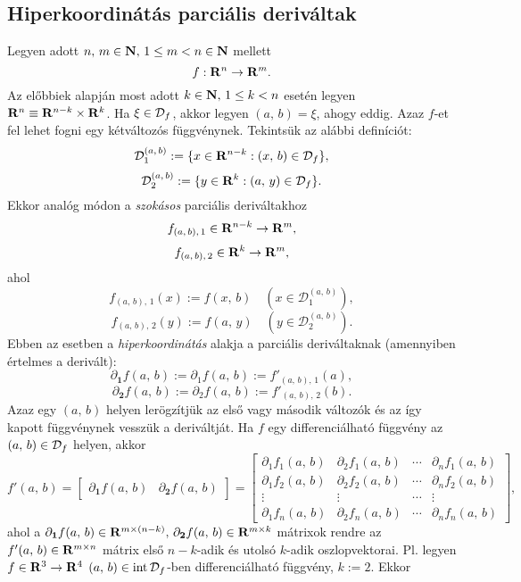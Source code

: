 \subsection{Hiperkoordinátás parciális deriváltak}
Legyen adott $n, \, m \in \mathbf{N}, \, 1 \leq m < n \in \mathbf{N}$ mellett
\[
	f : \mathbf{R}^n \to \mathbf{R}^m.
\]
Az előbbiek alapján most adott $k \in \mathbf{N}, \, 1 \leq k < n$ esetén legyen $\mathbf{R}^n \equiv \mathbf{R}^{n-k} \times \mathbf{R}^k$. Ha $\xi \in \mathcal{D}_f$, akkor legyen $(a, \, b) = \xi$, ahogy eddig. Azaz $f$-et fel lehet fogni egy kétváltozós függvénynek. Tekintsük az alábbi definíciót:
\[
	\mathcal{D}_1^{(a, \, b)} := \{ x \in \mathbf{R}^{n-k} : (x, \, b) \in \mathcal{D}_f \},
\]
\[
	\mathcal{D}_2^{(a, \, b)} := \{ y \in \mathbf{R}^{k} : (a, \, y) \in \mathcal{D}_f \}.
\]
Ekkor analóg módon a \textit{szokásos} parciális deriváltakhoz
\[
	f_{(a, \, b), \, 1}  \in \mathbf{R}^{n-k} \to \mathbf{R}^m, 
\]
\[
	f_{(a, \, b), \, 2}  \in \mathbf{R}^{k} \to \mathbf{R}^m,
\]
ahol
\[
	f_{(a, \, b), \, 1}(x) := f(x, \, b) \quad (x \in \mathcal{D}_1^{(a, \, b)}),
\]
\[
	f_{(a, \, b), \, 2}(y) := f(a, \, y) \quad (y \in \mathcal{D}_2^{(a, \, b)}).
\]
Ebben az esetben a \textit{hiperkoordinátás} alakja a parciális deriváltaknak (amennyiben értelmes a derivált):
\[
	\partial_{\mathbf{1}}f(a, \, b) := \partial_1f(a, \, b) := f'_{(a, \, b), \, 1}(a),
\]
\[
	\partial_{\mathbf{2}}f(a, \, b) := \partial_2f(a, \, b) := f'_{(a, \, b), \, 2}(b).	
\]
Azaz egy $(a, \, b)$ helyen lerögzítjük az első vagy második változók és az így kapott függvénynek vesszük a deriváltját. Ha $f$ egy differenciálható függvény az $(a, \, b) \in \mathcal{D}_f$ helyen, akkor
\[
	f'(a, \, b) = \begin{bmatrix}
		\partial_{\mathbf{1}}f(a, \, b) & \partial_{\mathbf{2}}f(a, \, b)
	\end{bmatrix} = \begin{bmatrix}
		\partial_1f_1(a, \, b) & \partial_2f_1(a, \, b) & \cdots & \partial_nf_1(a, \, b) \\
		\partial_1f_2(a, \, b) & \partial_2f_2(a, \, b) & \cdots & \partial_nf_2(a, \, b) \\
		\vdots & \vdots &\cdots & \vdots \\
		\partial_1f_n(a, \, b) & \partial_2f_n(a, \, b) & \cdots & \partial_nf_n(a, \, b)
	\end{bmatrix},
\]
ahol a $\partial_{\mathbf{1}}f(a, \, b) \in \mathbf{R}^{m \times (n-k)}, \, \partial_{\mathbf{2}}f(a, \, b) \in \mathbf{R}^{m \times k}$ mátrixok rendre az $f'(a, \, b) \in \mathbf{R}^{m \times n}$ mátrix első $n-k$-adik és utolsó $k$-adik oszlopvektorai. Pl. legyen $f \in \mathbf{R}^3 \to \mathbf{R}^4$ $(a, \, b) \in \text{int} \, \mathcal{D}_f$-ben differenciálható függvény, $k := 2$. Ekkor
